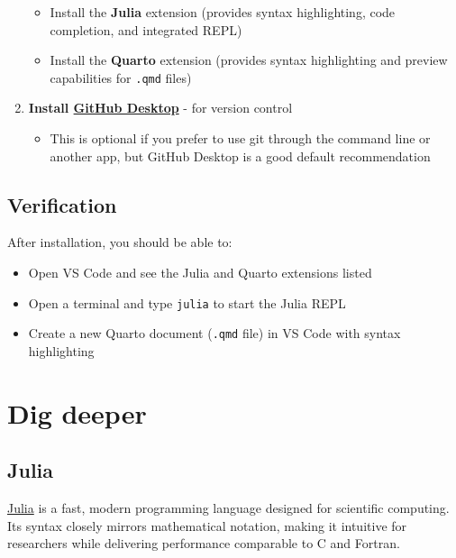 \documentclass[
  letterpaper,
  DIV=11,
  numbers=noendperiod]{scrreprt}
\providecommand{\tightlist}{%
  \setlength{\itemsep}{0pt}\setlength{\parskip}{0pt}}
\begin{document}
\begin{enumerate}
  \begin{itemize}
  \tightlist
  \item
    Install the \textbf{Julia} extension (provides syntax highlighting,
    code completion, and integrated REPL)
  \item
    Install the \textbf{Quarto} extension (provides syntax highlighting
    and preview capabilities for \texttt{.qmd} files)
  \end{itemize}
\item
  \textbf{Install \href{https://desktop.github.com/download/}{GitHub
  Desktop}} - for version control

  \begin{itemize}
  \tightlist
  \item
    This is optional if you prefer to use git through the command line
    or another app, but GitHub Desktop is a good default recommendation
  \end{itemize}
\end{enumerate}

\subsection{Verification}\label{verification}

After installation, you should be able to:

\begin{itemize}
\tightlist
\item
  Open VS Code and see the Julia and Quarto extensions listed
\item
  Open a terminal and type \texttt{julia} to start the Julia REPL
\item
  Create a new Quarto document (\texttt{.qmd} file) in VS Code with
  syntax highlighting
\end{itemize}

\section{Dig deeper}\label{dig-deeper}

\subsection{Julia}\label{julia}

\href{./julia.qmd}{Julia} is a fast, modern programming language
designed for scientific computing. Its syntax closely mirrors
mathematical notation, making it intuitive for researchers while
delivering performance comparable to C and Fortran.
\end{document}
